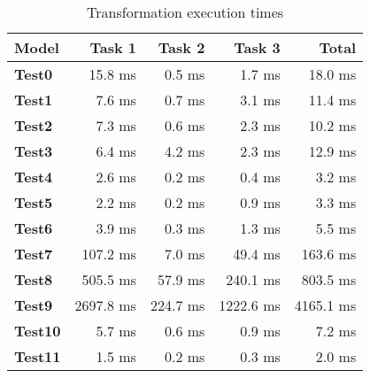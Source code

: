 \documentclass[11pt]{article}
\begin{document}
\begin{table}[h!]
  \centering
  \begin{tabular}{| l | r | r | r | r |}
    \hline
    \textbf{Model} & \textbf{Task 1} & \textbf{Task 2} & \textbf{Task 3} & \textbf{Total}\\
    \hline
    \textbf{Test0} & 15.8 ms & 0.5 ms & 1.7 ms & 18.0 ms\\
    \textbf{Test1} & 7.6 ms & 0.7 ms & 3.1 ms & 11.4 ms\\
    \textbf{Test2} & 7.3 ms & 0.6 ms & 2.3 ms & 10.2 ms\\
    \textbf{Test3} & 6.4 ms & 4.2 ms & 2.3 ms & 12.9 ms\\
    \textbf{Test4} & 2.6 ms & 0.2 ms & 0.4 ms & 3.2 ms\\
    \textbf{Test5} & 2.2 ms & 0.2 ms & 0.9 ms & 3.3 ms\\
    \textbf{Test6} & 3.9 ms & 0.3 ms & 1.3 ms & 5.5 ms\\
    \textbf{Test7} & 107.2 ms & 7.0 ms & 49.4 ms & 163.6 ms\\
    \textbf{Test8} & 505.5 ms & 57.9 ms & 240.1 ms & 803.5 ms\\
    \textbf{Test9} & 2697.8 ms & 224.7 ms & 1222.6 ms & 4165.1 ms\\
    \textbf{Test10} & 5.7 ms & 0.6 ms & 0.9 ms & 7.2 ms\\
    \textbf{Test11} & 1.5 ms & 0.2 ms & 0.3 ms & 2.0 ms\\
    \hline
  \end{tabular}
  \caption{Transformation execution times}
  \label{tab:eval-perf}
\end{table}





\end{document}

